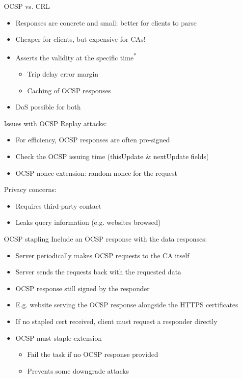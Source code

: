 \begin{frame}{OCSP vs. CRL}
  \begin{itemize}[<+(1)->]
    \item Responses are concrete and small: better for clients to parse
    \item Cheaper for clients, but expensive for CAs!
    \item Asserts the validity at the specific time\textsuperscript{*}
    \begin{itemize}
      \item Trip delay error margin
      \item Caching of OCSP responses
    \end{itemize}
    \item DoS possible for both
  \end{itemize}
\end{frame}

\begin{frame}{Issues with OCSP}  
  \pause
  Replay attacks:
  \begin{itemize}[<+(1)->]
    \item For efficiency, OCSP responses are often pre-signed
    \item Check the OCSP issuing time (thisUpdate \& nextUpdate fields)
    \item OCSP nonce extension: random nonce for the request
  \end{itemize}

  \pause
  Privacy concerns:
  \begin{itemize}[<+(1)->]
    \item Requires third-party contact
    \item Leaks query information (e.g. websites browsed)
  \end{itemize}
\end{frame}

\begin{frame}{OCSP stapling}
  \pause
  Include an OCSP response with the data responses:
  \begin{itemize}[<+(1)->]
    \item Server periodically makes OCSP requests to the CA itself
    \item Server sends the requests back with the requested data
    \item OCSP response still signed by the responder
    \item E.g. website serving the OCSP response alongside the HTTPS certificates
    \item If no stapled cert received, client must request a responder directly
    \item OCSP must staple extension
    \begin{itemize}
      \item Fail the task if no OCSP response provided
      \item Prevents some downgrade attacks
    \end{itemize}
  \end{itemize}
\end{frame}

